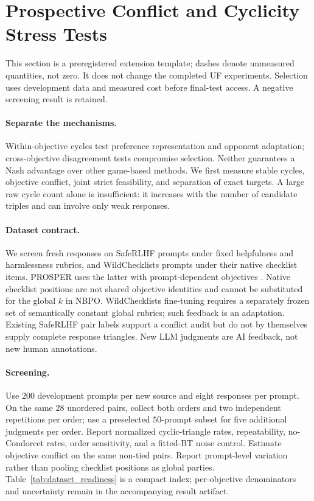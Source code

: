 \section{Prospective Conflict and Cyclicity Stress Tests}
\label{app:dataset_stress_test}
This section is a preregistered extension template; dashes denote unmeasured quantities, not zero. It does not change the completed UF experiments. Selection uses development data and measured cost before final-test access. A negative screening result is retained.

\paragraph{Separate the mechanisms.}
Within-objective cycles test preference representation and opponent adaptation; cross-objective disagreement tests compromise selection. Neither guarantees a Nash advantage over other game-based methods. We first measure stable cycles, objective conflict, joint strict feasibility, and separation of exact targets. A large raw cycle count alone is insufficient: it increases with the number of candidate triples and can involve only weak responses.

\paragraph{Dataset contract.}
We screen fresh responses on SafeRLHF prompts under fixed helpfulness and harmlessness rubrics, and WildChecklists prompts under their native checklist items. PROSPER uses the latter with prompt-dependent objectives \citep{zhang2026prosper}. Native checklist positions are not shared objective identities and cannot be substituted for the global $k$ in NBPO. WildChecklists fine-tuning requires a separately frozen set of semantically constant global rubrics; such feedback is an adaptation. Existing SafeRLHF pair labels support a conflict audit but do not by themselves supply complete response triangles. New LLM judgments are AI feedback, not new human annotations.

\paragraph{Screening.}
Use $200$ development prompts per new source and eight responses per prompt. On the same $28$ unordered pairs, collect both orders and two independent repetitions per order; use a preselected $50$-prompt subset for five additional judgments per order. Report normalized cyclic-triangle rates, repeatability, no-Condorcet rates, order sensitivity, and a fitted-BT noise control. Estimate objective conflict on the same non-tied pairs. Report prompt-level variation rather than pooling checklist positions as global parties. Table~\ref{tab:dataset_readiness} is a compact index; per-objective denominators and uncertainty remain in the accompanying result artifact.

